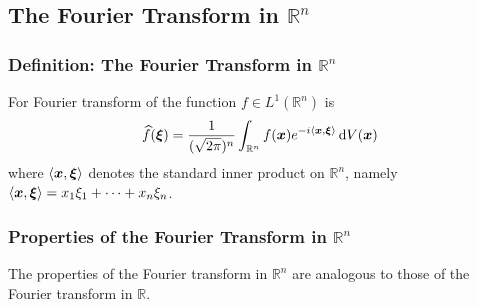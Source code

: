 \documentclass[11pt, a4paper]{article}
\newcommand{\diff}{\mathop{}\!\mathrm{d}} %
\newcommand{\R}{\mathbb{R}} %
\begin{document}
\subsection{The Fourier Transform in $ \R^n $}

\subsubsection{Definition: The Fourier Transform in $ \R^n $}
For Fourier transform of the function $ f \in L^{1}(\R^n) $ is
\begin{equation*}
	\widehat{f}(\bm{\xi}) = \frac{1}{(\sqrt{2\pi})^n} \int_{\R^n} f(\bm{x})e^{-i \expval{\bm{x}, \bm{\xi}}} \diff V (\bm{x})
\end{equation*}
where $ \expval{\bm{x}, \bm{\xi}} $ denotes the standard inner product on $ \R^n $, namely $ \expval{\bm{x}, \bm{\xi}} = x_1 \xi_1 + \dots + x_n \xi_n $.

\subsubsection{Properties of the Fourier Transform in $ \R^n $}
The properties of the Fourier transform in $ \R^n $ are analogous to those of the Fourier transform in $ \R $. 
\end{document}
